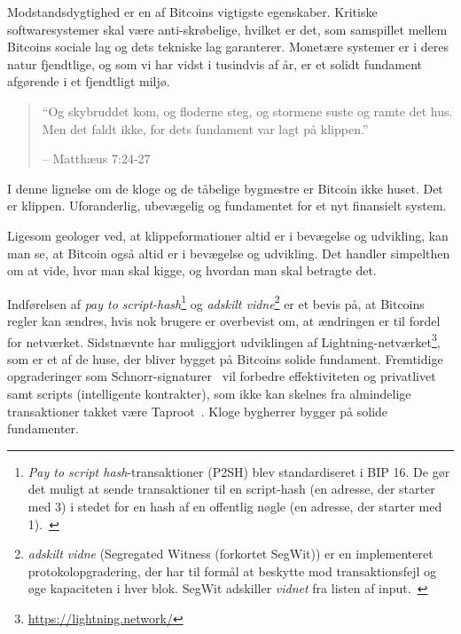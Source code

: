 \documentclass[paper=6in:9in,pagesize=pdftex,
               headinclude=on,footinclude=on,12pt]{scrbook}
\begin{document}
Modstandsdygtighed er en af Bitcoins vigtigste egenskaber. Kritiske softwaresystemer skal være anti-skrøbelige, hvilket er det, som samspillet mellem Bitcoins sociale lag og dets tekniske lag garanterer. Monetære systemer er i deres natur fjendtlige, og som vi har vidst i tusindvis af år, er et solidt fundament afgørende i et fjendtligt miljø.\begin{quotation}\begin{samepage} \enquote{Og skybruddet kom, og floderne steg, og stormene suste og ramte det hus. Men det faldt ikke, for dets fundament var lagt på klippen.} \begin{flushright} -- Matthæus 7:24-27 \end{flushright}\end{samepage}\end{quotation}

I denne lignelse om de kloge og de tåbelige bygmestre er Bitcoin ikke huset. Det er klippen. Uforanderlig, ubevægelig og fundamentet for et nyt finansielt system.

Ligesom geologer ved, at klippeformationer altid er i bevægelse og udvikling, kan man se, at Bitcoin også altid er i bevægelse og udvikling. Det handler simpelthen om at vide, hvor man skal kigge, og hvordan man skal betragte det.

Indførelsen af \textit{pay to script-hash}\footnote{ \textit{Pay to script hash}-transaktioner (P2SH) blev standardiseret i BIP 16. De gør det muligt at sende transaktioner til en script-hash (en adresse, der starter med 3) i stedet for en hash af en offentlig nøgle (en adresse, der starter med 1).~\cite{btcwiki:p2sh}} og \textit{adskilt vidne}\footnote{\textit{adskilt vidne} (Segregated Witness (forkortet SegWit)) er en implementeret protokolopgradering, der har til formål at beskytte mod transaktionsfejl og øge kapaciteten i hver blok. SegWit adskiller \textit{vidnet} fra listen af input.~\cite{btcwiki:segwit}} er et bevis på, at Bitcoins regler kan ændres, hvis nok brugere er overbevist om, at ændringen er til fordel for netværket. Sidstnævnte har muliggjort udviklingen af Lightning-netværket\footnote{\url{https://lightning.network/}}, som er et af de huse, der bliver bygget på Bitcoins solide fundament. Fremtidige opgraderinger som Schnorr-signaturer~\cite{bip:schnorr} vil forbedre effektiviteten og privatlivet samt scripts (intelligente kontrakter), som ikke kan skelnes fra almindelige transaktioner takket være Taproot~\cite{taproot}. Kloge bygherrer bygger på solide fundamenter.
\end{document}
